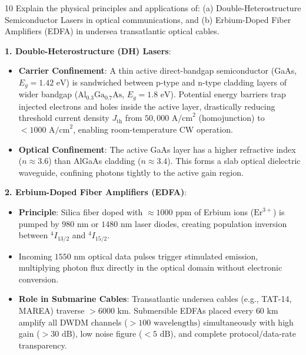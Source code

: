 \begin{theoryq}{10}
Explain the physical principles and applications of: (a) Double-Heterostructure Semiconductor Lasers in optical communications, and (b) Erbium-Doped Fiber Amplifiers (EDFA) in undersea transatlantic optical cables.
\end{theoryq}
\begin{theorysol}
\textbf{1. Double-Heterostructure (DH) Lasers}:
\begin{itemize}
    \item \textbf{Carrier Confinement}: A thin active direct-bandgap semiconductor (GaAs, $E_g = 1.42\text{ eV}$) is sandwiched between p-type and n-type cladding layers of wider bandgap ($\text{Al}_{0.3}\text{Ga}_{0.7}\text{As}$, $E_g = 1.8\text{ eV}$). Potential energy barriers trap injected electrons and holes inside the active layer, drastically reducing threshold current density $J_{\text{th}}$ from $50,000\text{ A/cm}^2$ (homojunction) to $< 1000\text{ A/cm}^2$, enabling room-temperature CW operation.
    \item \textbf{Optical Confinement}: The active GaAs layer has a higher refractive index ($n \approx 3.6$) than AlGaAs cladding ($n \approx 3.4$). This forms a slab optical dielectric waveguide, confining photons tightly to the active gain region.
\end{itemize}

\textbf{2. Erbium-Doped Fiber Amplifiers (EDFA)}:
\begin{itemize}
    \item \textbf{Principle}: Silica fiber doped with $\approx 1000\text{ ppm}$ of Erbium ions ($\text{Er}^{3+}$) is pumped by $980\text{ nm}$ or $1480\text{ nm}$ laser diodes, creating population inversion between $^4I_{13/2}$ and $^4I_{15/2}$.
    \item Incoming $1550\text{ nm}$ optical data pulses trigger stimulated emission, multiplying photon flux directly in the optical domain without electronic conversion.
    \item \textbf{Role in Submarine Cables}: Transatlantic undersea cables (e.g., TAT-14, MAREA) traverse $> 6000\text{ km}$. Submersible EDFAs placed every $60\text{ km}$ amplify all DWDM channels ($> 100\text{ wavelengths}$) simultaneously with high gain ($> 30\text{ dB}$), low noise figure ($< 5\text{ dB}$), and complete protocol/data-rate transparency.
\end{itemize}

\end{theorysol}
\vspace{4mm}

